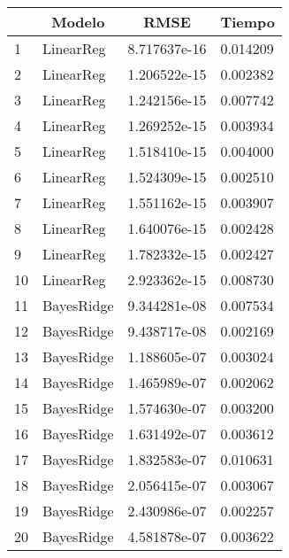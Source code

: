 \documentclass[13.6pt]{article}
\begin{document}
\begin{table}[h] \centering
\begin{tabular}{llll}
\hline
\textbf{} & \multicolumn{1}{c}{\textbf{Modelo}} & \multicolumn{1}{c}{\textbf{RMSE}} & \multicolumn{1}{c}{\textbf{Tiempo}} \\ \hline
1         & LinearReg       & 8.717637e-16  & 0.014209        \\
2         & LinearReg       & 1.206522e-15  & 0.002382        \\
3         & LinearReg       & 1.242156e-15  & 0.007742        \\
4         & LinearReg       & 1.269252e-15  & 0.003934        \\
5         & LinearReg       & 1.518410e-15  & 0.004000        \\
6         & LinearReg       & 1.524309e-15  & 0.002510        \\
7         & LinearReg       & 1.551162e-15  & 0.003907        \\
8         & LinearReg       & 1.640076e-15  & 0.002428        \\
9         & LinearReg       & 1.782332e-15  & 0.002427        \\
10        & LinearReg       & 2.923362e-15  & 0.008730        \\
11        & BayesRidge      & 9.344281e-08  & 0.007534        \\
12        & BayesRidge      & 9.438717e-08  & 0.002169        \\
13        & BayesRidge      & 1.188605e-07  & 0.003024        \\
14        & BayesRidge      & 1.465989e-07  & 0.002062        \\
15        & BayesRidge      & 1.574630e-07  & 0.003200        \\
16        & BayesRidge      & 1.631492e-07  & 0.003612        \\
17        & BayesRidge      & 1.832583e-07  & 0.010631        \\
18        & BayesRidge      & 2.056415e-07  & 0.003067        \\
19        & BayesRidge      & 2.430986e-07  & 0.002257        \\
20        & BayesRidge      & 4.581878e-07  & 0.003622        \\ \hline
\end{tabular}
\end{table}


\newpage

\end{document}
